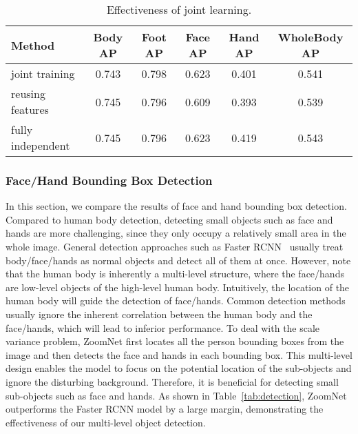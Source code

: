 \documentclass[runningheads]{llncs}
\begin{document}
	\begin{table}[t]
		\caption{Effectiveness of joint learning.}
		\begin{center}
			\begin{tabular}{l|c|c|c|c|c}
				\hline
				Method & Body AP & Foot AP & Face AP & Hand AP & WholeBody AP \\
				\hline
				joint training	& 0.743 &	0.798 &	0.623 &	0.401 &	0.541 \\
				reusing features &	0.745 &	0.796 &	0.609 &	0.393 &	0.539 \\
				fully independent &	0.745 &	0.796 &	0.623 &	0.419 &	0.543 \\
				\hline
			\end{tabular}
		\end{center}
		\label{tab:joint_learning}
	\end{table}
	
	
	\subsubsection{Face/Hand Bounding Box Detection}
	
	In this section, we compare the results of face and hand bounding box detection. Compared to human body detection, detecting small objects such as face and hands are more challenging, since they only occupy a relatively small area in the whole image. General detection approaches such as Faster RCNN~\cite{renNIPS15fasterrcnn} usually treat body/face/hands as normal objects and detect all of them at once. However, note that the human body is inherently a multi-level structure, where the face/hands are low-level objects of the high-level human body. Intuitively, the location of the human body will guide the detection of face/hands. Common detection methods usually ignore the inherent correlation between the human body and the face/hands, which will lead to inferior performance. To deal with the scale variance problem, ZoomNet first locates all the person bounding boxes from the image and then detects the face and hands in each bounding box. This multi-level design enables the model to focus on the potential location of the sub-objects and ignore the disturbing background. Therefore, it is beneficial for detecting small sub-objects such as face and hands. As shown in Table~\ref{tab:detection}, ZoomNet outperforms the Faster RCNN model by a large margin, demonstrating the effectiveness of our multi-level object detection. 
	
	
	
\end{document}
